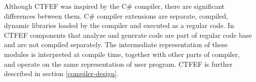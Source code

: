 Although CTFEF was inspired by the C\# compiler, there are significant differences between them.
C\# compiler extensions are separate, compiled, dynamic libraries loaded by the compiler and executed as a regular code.
In CTFEF components that analyze and generate code are part of regular code base and are not compiled separately.
The intermediate representation of these modules is interpreted at compile time, together with other parts of compiler, and operate on the same representation of user program.
CTFEF is further described in section \ref{compiler-design}.

